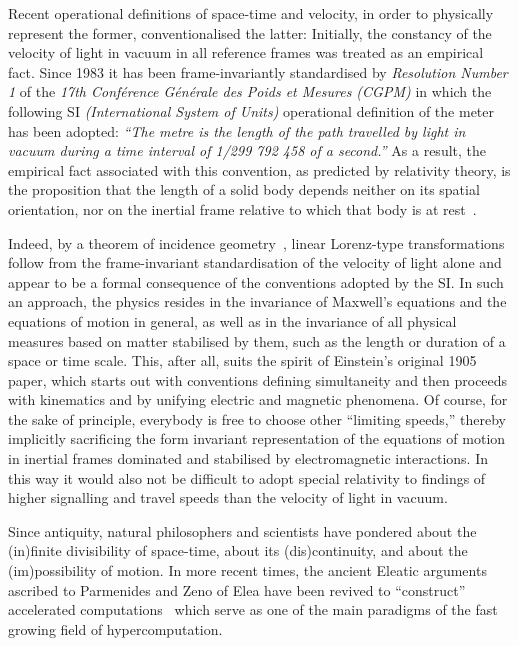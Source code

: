 \documentclass[12pt]{article}
\begin{document}
Recent operational definitions of space-time and velocity, in order to physically represent the former, conventionalised the latter:
Initially,  the constancy of the velocity of light in vacuum in all reference frames was treated
as an empirical fact.  Since 1983 it has been
frame-invariantly standardised
by {\it Resolution Number 1} of the {\it  17th Conf{\'e}rence G{\'e}n{\'e}rale des Poids et Mesures (CGPM)}
in which the following SI {\it (International System of Units)} operational definition of the meter
has been adopted:
{\em ``The metre is the length of the path travelled by light
in vacuum during a time interval of 1/299 792 458 of a second.''}
As a result, the empirical fact associated with this convention,
as predicted by relativity theory,
is the proposition that the length of a solid body depends neither on its spatial orientation,
nor on the inertial frame relative to which that body is at rest~\cite{peres-84}.

Indeed, by a theorem of
incidence geometry~\cite{lester},
linear Lorenz-type transformations follow from the frame-invariant standardisation of the velocity of light alone
and appear to be a formal consequence of the conventions adopted by the SI.
In such an approach, the physics resides in the invariance of Maxwell's equations and the equations of motion in general,
as well as in the invariance
of all physical measures based on matter stabilised by them, such as the length or duration of a space or time scale.
This, after all, suits the spirit of Einstein's original 1905 paper,
which starts out with conventions defining simultaneity and then proceeds with kinematics and by unifying electric and magnetic phenomena.
Of course, for the sake of principle, everybody is free to choose other ``limiting speeds,''
thereby implicitly sacrificing the form invariant representation of the equations of motion in inertial frames dominated and stabilised by electromagnetic interactions.
In this way it would also not be difficult to adopt special relativity
to findings of higher signalling and travel speeds than the velocity of light in vacuum.



Since antiquity, natural philosophers and scientists have pondered about
the (in)finite divisibility of space-time, about its (dis)continuity, and
about the (im)possibility of motion.
In more recent times, the ancient Eleatic arguments ascribed to Parmenides and Zeno of Elea
have been revived to ``construct'' accelerated computations~\cite{weyl:49}
which serve as one of the main paradigms of the fast growing field of hypercomputation.
\end{document}
